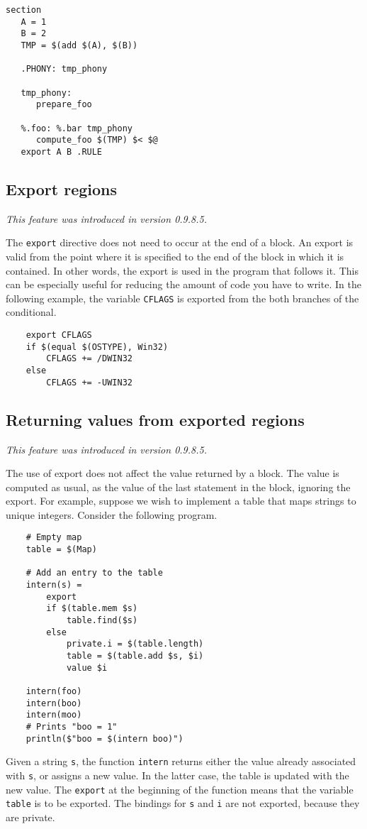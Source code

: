 \begin{verbatim}
section
   A = 1
   B = 2
   TMP = $(add $(A), $(B))

   .PHONY: tmp_phony

   tmp_phony:
      prepare_foo

   %.foo: %.bar tmp_phony
      compute_foo $(TMP) $< $@
   export A B .RULE
\end{verbatim}

\subsection{Export regions}

\textit{This feature was introduced in version 0.9.8.5.}

The \verb+export+ directive does not need to occur at the end of a block.  An export is valid from
the point where it is specified to the end of the block in which it is contained.  In other words,
the export is used in the program that follows it.  This can be especially useful for reducing the
amount of code you have to write.  In the following example, the variable \verb+CFLAGS+ is exported
from the both branches of the conditional.

\begin{verbatim}
    export CFLAGS
    if $(equal $(OSTYPE), Win32)
        CFLAGS += /DWIN32
    else
        CFLAGS += -UWIN32
\end{verbatim}

\subsection{Returning values from exported regions}

\textit{This feature was introduced in version 0.9.8.5.}

The use of export does not affect the value returned by a block.  The value is computed as usual, as
the value of the last statement in the block, ignoring the export.  For example, suppose we wish to
implement a table that maps strings to unique integers.  Consider the following program.

\begin{verbatim}
    # Empty map
    table = $(Map)

    # Add an entry to the table
    intern(s) =
        export
        if $(table.mem $s)
            table.find($s)
        else
            private.i = $(table.length)
            table = $(table.add $s, $i)
            value $i

    intern(foo)
    intern(boo)
    intern(moo)
    # Prints "boo = 1"
    println($"boo = $(intern boo)")
\end{verbatim}
%
Given a string \verb+s+, the function \verb+intern+ returns either the value already associated with
\verb+s+, or assigns a new value.  In the latter case, the table is updated with the new value.  The
\verb+export+ at the beginning of the function means that the variable \verb+table+ is to be
exported.  The bindings for \verb+s+ and \verb+i+ are not exported, because they are private.

